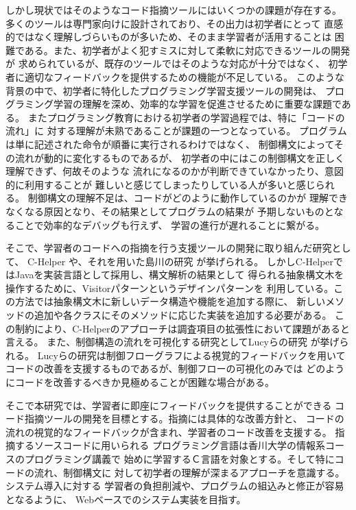 \documentclass{cssspaper}
\begin{document}
        しかし現状ではそのようなコード指摘ツールにはいくつかの課題が存在する。
        多くのツールは専門家向けに設計されており、その出力は初学者にとって
        直感的ではなく理解しづらいものが多いため、そのまま学習者が活用することは
        困難である。また、初学者がよく犯すミスに対して柔軟に対応できるツールの開発が
        求められているが、既存のツールではそのような対応が十分ではなく、
        初学者に適切なフィードバックを提供するための機能が不足している。
        このような背景の中で、初学者に特化したプログラミング学習支援ツールの開発は、
        プログラミング学習の理解を深め、効率的な学習を促進させるために重要な課題である。
        またプログラミング教育における初学者の学習過程では、特に「コードの流れ」に
        対する理解が未熟であることが課題の一つとなっている。
        プログラムは単に記述された命令が順番に実行されるわけではなく、
        制御構文によってその流れが動的に変化するものであるが、
        初学者の中にはこの制御構文を正しく理解できず、何故そのような
        流れになるのかが判断できていなかったり、意図的に利用することが
        難しいと感じてしまったりしている人が多いと感じられる。
        制御構文の理解不足は、コードがどのように動作しているのかが
        理解できなくなる原因となり、その結果としてプログラムの結果が
        予期しないものとなることで効率的なデバッグも行えず、
        学習の進行が遅れることに繋がる。

        そこで、学習者のコードへの指摘を行う支援ツールの開発に取り組んだ研究として、
        C-Helper \cite{1,2,3}や、それを用いた島川の研究 \cite{4}が挙げられる。
        しかしC-HelperではJavaを実装言語として採用し、構文解析の結果として
        得られる抽象構文木を操作するために、Visitorパターンというデザインパターンを
        利用している。この方法では抽象構文木に新しいデータ構造や機能を追加する際に、
        新しいメソッドの追加や各クラスにそのメソッドに応じた実装を追加する必要がある。
        この制約により、C-Helperのアプローチは調査項目の拡張性において課題があると言える。
        また、制御構造の流れを可視化する研究としてLucyらの研究 \cite{5}が挙げられる。
        Lucyらの研究は制御フローグラフによる視覚的フィードバックを用いて
        コードの改善を支援するものであるが、制御フローの可視化のみでは
        どのようにコードを改善するべきか見極めることが困難な場合がある。

        そこで本研究では、学習者に即座にフィードバックを提供することができる
        コード指摘ツールの開発を目標とする。指摘には具体的な改善方針と、
        コードの流れの視覚的なフィードバックが含まれ、学習者のコード改善を支援する。
        指摘するソースコードに用いられる
        プログラミング言語は香川大学の情報系コースのプログラミング講義で
        始めに学習するＣ言語を対象とする。そして特にコードの流れ、制御構文に
        対して初学者の理解が深まるアプローチを意識する。システム導入に対する
        学習者の負担削減や、プログラムの組込みと修正が容易となるように、
        Webベースでのシステム実装を目指す。
\end{document}
